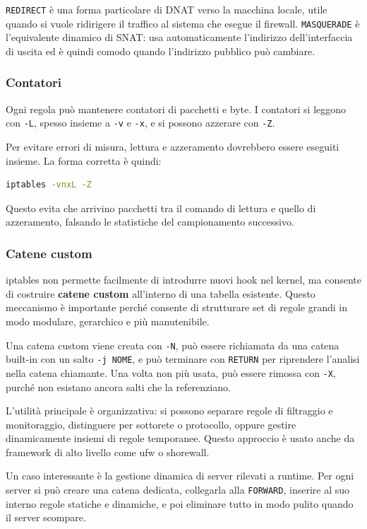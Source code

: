 \documentclass[12pt, a4paper]{report}
\begin{document}
\texttt{REDIRECT} è una forma particolare di DNAT verso la macchina locale, utile quando si vuole ridirigere il traffico al sistema che esegue il firewall. \texttt{MASQUERADE} è l'equivalente dinamico di SNAT: usa automaticamente l'indirizzo dell'interfaccia di uscita ed è quindi comodo quando l'indirizzo pubblico può cambiare.

\subsubsection{Contatori}
Ogni regola può mantenere contatori di pacchetti e byte. I contatori si leggono con \texttt{-L}, spesso insieme a \texttt{-v} e \texttt{-x}, e si possono azzerare con \texttt{-Z}.

Per evitare errori di misura, lettura e azzeramento dovrebbero essere eseguiti insieme. La forma corretta è quindi:
\begin{lstlisting}[language=bash]
	iptables -vnxL -Z
\end{lstlisting}
Questo evita che arrivino pacchetti tra il comando di lettura e quello di azzeramento, falsando le statistiche del campionamento successivo.

\subsubsection{Catene custom}
iptables non permette facilmente di introdurre nuovi hook nel kernel, ma consente di costruire \textbf{catene custom} all'interno di una tabella esistente. Questo meccanismo è importante perché consente di strutturare set di regole grandi in modo modulare, gerarchico e più manutenibile.

Una catena custom viene creata con \texttt{-N}, può essere richiamata da una catena built-in con un salto \texttt{-j NOME}, e può terminare con \texttt{RETURN} per riprendere l'analisi nella catena chiamante. Una volta non più usata, può essere rimossa con \texttt{-X}, purché non esistano ancora salti che la referenziano.

L'utilità principale è organizzativa: si possono separare regole di filtraggio e monitoraggio, distinguere per sottorete o protocollo, oppure gestire dinamicamente insiemi di regole temporanee. Questo approccio è usato anche da framework di alto livello come ufw o shorewall.

Un caso interessante è la gestione dinamica di server rilevati a runtime. Per ogni server si può creare una catena dedicata, collegarla alla \texttt{FORWARD}, inserire al suo interno regole statiche e dinamiche, e poi eliminare tutto in modo pulito quando il server scompare.
\end{document}
